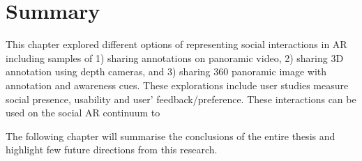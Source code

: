 \section{Summary}

This chapter explored different options of representing social interactions in AR including samples of 1) sharing annotations on panoramic video, 2) sharing 3D annotation using depth cameras, and 3) sharing 360 panoramic image with annotation and awareness cues. These explorations include user studies measure social presence, usability and user' feedback/preference. These interactions can be used on the social AR continuum to  

The following chapter will summarise the conclusions of the entire thesis and highlight few future directions from this research.

